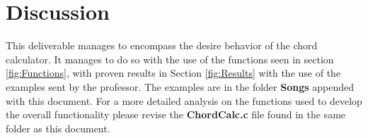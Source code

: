 \documentclass{article}
\begin{document}
\section{Discussion}
This deliverable manages to encompass the desire behavior of the chord calculator. It manages to do so with the use of the functions seen in section \ref{fig:Functions}, with proven results in Section \ref{fig:Results} with the use of the examples sent by the professor. The examples are in the folder \textbf{Songs} appended with this document. For a more detailed analysis on the functions used to develop the overall functionality please revise the \textbf{ChordCalc.c} file found in the same folder as this document.
\end{document}
